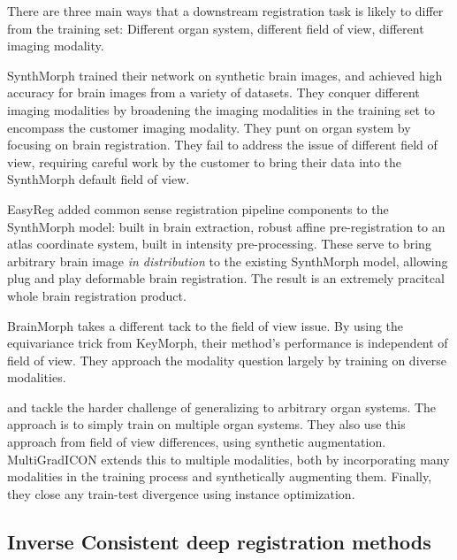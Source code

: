 \documentclass{article}
\begin{document}
There are three main ways that a downstream registration task is likely to differ from the training set: Different organ system, different field of view, different imaging modality.

SynthMorph\cite{SynthMorph} trained their network on synthetic brain images, and achieved high accuracy for brain images from a variety of datasets. They conquer different imaging modalities by broadening the imaging modalities in the training set to encompass the customer imaging modality. They punt on organ system by focusing on brain registration. They fail to address the issue of different field of view, requiring careful work by the customer to bring their data into the SynthMorph default field of view.

EasyReg\cite{EasyReg} added common sense registration pipeline components to the SynthMorph model: built in brain extraction, robust affine pre-registration to an atlas coordinate system, built in intensity pre-processing. These serve to bring arbitrary brain image \emph{in distribution} to the existing SynthMorph model, allowing plug and play deformable brain registration. The result is an extremely pracitcal whole brain registration product.

BrainMorph\cite{BrainMorph} takes a different tack to the field of view issue. By using the equivariance trick from KeyMorph\cite{KeyMorph}, their method's performance is independent of field of view. They approach the modality question largely by training on diverse modalities.

\cite{uniGradICON} and \cite{multiGradICON} tackle the harder challenge of generalizing to arbitrary organ systems. The approach is to simply train on multiple organ systems. They also use this approach from field of view differences, using synthetic augmentation. MultiGradICON extends this to multiple modalities, both by incorporating many modalities in the training process and synthetically augmenting them. Finally, they close any train-test divergence using instance optimization.

\subsection{Inverse Consistent deep registration methods}
\end{document}
